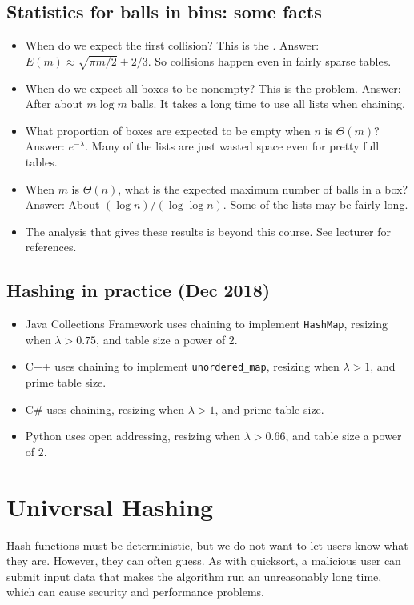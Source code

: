 \section{Statistics for balls in bins: some facts}
\begin{itemize}
\item When do we expect the first collision? This is the . 
Answer: $E(m) \approx \sqrt{\pi m/2} + 2/3$.
So collisions happen even in fairly sparse tables.
\item When do we expect all boxes to be nonempty? 
This is the  problem. Answer: After about $m \log m$ balls. 
It takes a long time to use all lists when chaining.
\item What proportion of boxes are expected to be empty when $n$ is $\Theta(m)$? 
Answer: $e^{-\lambda}$. Many of the lists are just wasted space even for 
pretty full tables.
\item When $m$ is $\Theta(n)$, what is the expected maximum number of balls in a box? 
Answer: About $(\log n)/(\log \log n)$. Some of the lists may be fairly long. 
\item The analysis that gives these results is beyond this course. See lecturer for references.
\end{itemize}

\section{Hashing in practice (Dec 2018)}
\begin{itemize}
\item Java Collections Framework uses chaining to implement \texttt{HashMap}, resizing when $\lambda > 0.75$, and table size a power of $2$.
\item C++  uses chaining to implement \texttt{unordered\_map}, resizing when $\lambda >1$, and prime table size.
\item C\# uses chaining, resizing when $\lambda > 1$, and prime table size.
\item Python uses open addressing, resizing when $\lambda > 0.66$, and table size a power of $2$.
\end{itemize}



\chapter{Universal Hashing} %
Hash functions must be deterministic, but we do not want to let users know what they are. 
However, they can often guess. As with quicksort, a malicious user can submit input data that makes the 
algorithm run an unreasonably long time, which can cause security and performance problems.


